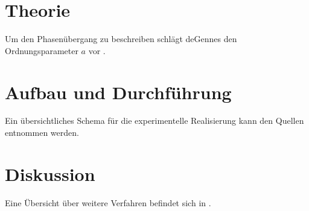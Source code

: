 \documentclass[captions=tableheading]{scrartcl}
\begin{document}
  \section{Theorie}
    Um den Phasenübergang zu beschreiben schlägt deGennes den Ordnungsparameter $a$ vor \cite[2-8]{deGennes}.
  \section{Aufbau und Durchführung}
    Ein übersichtliches Schema für die experimentelle Realisierung kann den Quellen \cite{martin, magnet} entnommen werden.
  \section{Diskussion}
    Eine Übersicht über weitere Verfahren befindet sich in \cite{kent}.
  \printbibliography
\end{document}

